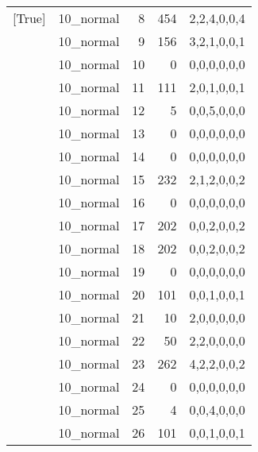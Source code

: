 \begin{tabular}{llrrl}
 [True]          & 10\_normal           &             8 &                   454 & 2,2,4,0,0,4   \\
 [True]          & 10\_normal           &             9 &                   156 & 3,2,1,0,0,1   \\
 [True]          & 10\_normal           &            10 &                     0 & 0,0,0,0,0,0   \\
 [True]          & 10\_normal           &            11 &                   111 & 2,0,1,0,0,1   \\
 [True]          & 10\_normal           &            12 &                     5 & 0,0,5,0,0,0   \\
 [True]          & 10\_normal           &            13 &                     0 & 0,0,0,0,0,0   \\
 [True]          & 10\_normal           &            14 &                     0 & 0,0,0,0,0,0   \\
 [True]          & 10\_normal           &            15 &                   232 & 2,1,2,0,0,2   \\
 [True]          & 10\_normal           &            16 &                     0 & 0,0,0,0,0,0   \\
 [True]          & 10\_normal           &            17 &                   202 & 0,0,2,0,0,2   \\
 [True]          & 10\_normal           &            18 &                   202 & 0,0,2,0,0,2   \\
 [True]          & 10\_normal           &            19 &                     0 & 0,0,0,0,0,0   \\
 [True]          & 10\_normal           &            20 &                   101 & 0,0,1,0,0,1   \\
 [True]          & 10\_normal           &            21 &                    10 & 2,0,0,0,0,0   \\
 [True]          & 10\_normal           &            22 &                    50 & 2,2,0,0,0,0   \\
 [True]          & 10\_normal           &            23 &                   262 & 4,2,2,0,0,2   \\
 [True]          & 10\_normal           &            24 &                     0 & 0,0,0,0,0,0   \\
 [True]          & 10\_normal           &            25 &                     4 & 0,0,4,0,0,0   \\
 [True]          & 10\_normal           &            26 &                   101 & 0,0,1,0,0,1   \\

\end{tabular}
